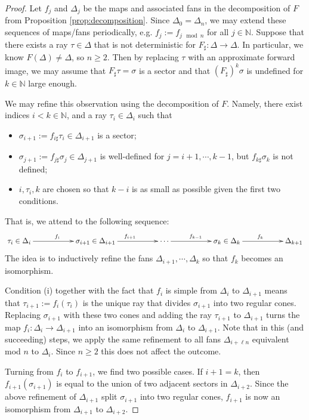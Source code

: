 \documentclass[11pt]{amsart}
\theoremstyle{definition}
\theoremstyle{plain}
\theoremstyle{remark}
\numberwithin{equation}{section}
\def\N{\mathbb{N}}
\def\fan{\Delta}
\begin{document}
\begin{proof}
Let $f_j$ and $\Delta_j$ be the maps and associated fans in the decomposition of $F$ from Proposition \ref{prop:decomposition}.  Since $\Delta_0 = \Delta_n$, we may extend these sequences of maps/fans periodically, e.g. $f_j := f_{j\mod n}$ for all $j\in\N$.  Suppose that there exists a ray $\tau\in\Delta$ that is not deterministic for $F_\sharp:\Delta\to\Delta$.  In particular, we know $F(\Delta)\neq \Delta$, so $n\geq 2$.  Then by replacing $\tau$ with an approximate forward image, we may assume that $F_\sharp \tau = \sigma$ is a sector and that $(F_\sharp)^k \sigma$ is undefined for $k\in\N$ large enough.  

We may refine this observation using the decomposition of $F$.  Namely, there exist indices $i < k \in\N$, and a ray $\tau_i\in\Delta_i$ such that
\begin{itemize}
 \item[(i)] $\sigma_{i+1} := f_{i\sharp} \tau_i \in \Delta_{i+1}$ is a sector;
 \item[(ii)] $\sigma_{j+1} := f_{j\sharp}\sigma_j \in \fan_{j+1}$ is well-defined for $ j =i+1,\cdots, k-1$, but $f_{k\sharp}\sigma_{k}$ is not defined;
 \item[(iii)] $i,\tau_i,k$ are chosen so that $k-i$ is as small as possible given the first two conditions. 
\end{itemize}
That is, we attend to the following sequence:
\[
\xymatrix{
\tau_i\in\fan_{i} \ar[rr]^{f_i} && \sigma_{i+1}\in\fan_{i+1} \ar[rr]^{f_{i+1}} &&\cdots \ar[rr]^{f_{k-1}} &&
\sigma_{k}\in\fan_k  \ar[rr]^{f_k} &&
\fan_{k+1} 
}
\]
The idea is to inductively refine the fans $\fan_{i+1},\cdots,\fan_{k}$ so that $f_k$ becomes an isomorphism.
 
Condition (i) together with the fact that $f_i$ is simple from $\Delta_i$ to $\Delta_{i+1}$ means that $\tau_{i+1} := f_i(\tau_i)$ is the unique ray that divides $\sigma_{i+1}$ into two regular cones.  Replacing $\sigma_{i+1}$ with these two cones and adding the ray $\tau_{i+1}$ to $\Delta_{i+1}$ turns the map $f_i:\Delta_i\to\Delta_{i+1}$ into an isomorphism from $\Delta_i$ to $\Delta_{i+1}$.  Note that in this (and succeeding) steps, we apply the same refinement to all fans $\Delta_{i+\ell n}$ equivalent mod $n$ to $\Delta_i$.  Since $n\geq 2$ this does not affect the outcome.

Turning from $f_i$ to $f_{i+1}$, we find two possible cases.  If $i+1=k$, then $f_{i+1}(\sigma_{i+1})$ is equal to the union of two adjacent sectors in $\Delta_{i+2}$.  Since the above refinement of $\Delta_{i+1}$ split $\sigma_{i+1}$ into two regular cones, $f_{i+1}$ is now an isomorphism from $\Delta_{i+1}$ to $\Delta_{i+2}$. 


\end{proof}
\end{document}
